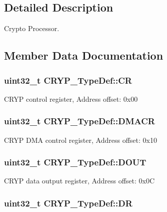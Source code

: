 \subsection{Detailed Description}
Crypto Processor. 

\subsection{Member Data Documentation}
\hypertarget{struct_c_r_y_p___type_def_a65da2a40a06c5c391cbe346dbaa5380c}{
\subsubsection[{C\-R}]{ uint32\-\_\-t C\-R\-Y\-P\-\_\-\-Type\-Def\-::\-C\-R}}\label{struct_c_r_y_p___type_def_a65da2a40a06c5c391cbe346dbaa5380c}
C\-R\-Y\-P control register, Address offset\-: 0x00 \hypertarget{struct_c_r_y_p___type_def_ad525241894427fc83a16e3370bb5b1d8}{
\subsubsection[{D\-M\-A\-C\-R}]{ uint32\-\_\-t C\-R\-Y\-P\-\_\-\-Type\-Def\-::\-D\-M\-A\-C\-R}}\label{struct_c_r_y_p___type_def_ad525241894427fc83a16e3370bb5b1d8}
C\-R\-Y\-P D\-M\-A control register, Address offset\-: 0x10 \hypertarget{struct_c_r_y_p___type_def_a0b3e1f1551d11a01f7b2356e91281e7d}{
\subsubsection[{D\-O\-U\-T}]{ uint32\-\_\-t C\-R\-Y\-P\-\_\-\-Type\-Def\-::\-D\-O\-U\-T}}\label{struct_c_r_y_p___type_def_a0b3e1f1551d11a01f7b2356e91281e7d}
C\-R\-Y\-P data output register, Address offset\-: 0x0\-C \hypertarget{struct_c_r_y_p___type_def_ab478a4717a3fa209b9c060ecaf70c9a1}{
\subsubsection[{D\-R}]{ uint32\-\_\-t C\-R\-Y\-P\-\_\-\-Type\-Def\-::\-D\-R}}\label{struct_c_r_y_p___type_def_ab478a4717a3fa209b9c060ecaf70c9a1}
